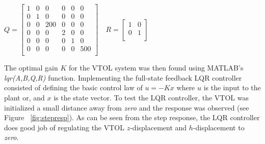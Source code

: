 \documentclass[dvips,12pt]{article}
\begin{document}
\begin{center}
$
 Q
 = 
   \begin{bmatrix}
        1 & 0 & 0 & 0 & 0 & 0  \\
        0 & 1 & 0 & 0 & 0 & 0 \\
        0 & 0 & 200 & 0 & 0 & 0 \\
        0 & 0 & 0 & 2 & 0 & 0 \\
        0 & 0 & 0 & 0 & 1 & 0 \\
        0 & 0 & 0 & 0 & 0 & 500 \\
      \end{bmatrix}
      \quad
      R
       = 
         \begin{bmatrix}
              1 & 0  \\
              0 & 1  \\
            \end{bmatrix}         
$
\end{center}
The optimal gain $K$ for the VTOL system was then found using MATLAB's \textit{lqr(A,B,Q,R)} function.  Implementing the full-state feedback LQR controller consisted of defining the basic control law of $u = -Kx$ where $u$ is the input to the plant or, and $x$ is the state vector.  To test the LQR controller, the VTOL was initialized a small distance away from \textit{zero} and the response was observed (see Figure ~\ref{fig:stepresp}).  As can be seen from the step response, the LQR controller does good job of regulating the VTOL $z$-displacement and $h$-displacement to \textit{zero}. 
\end{document}
